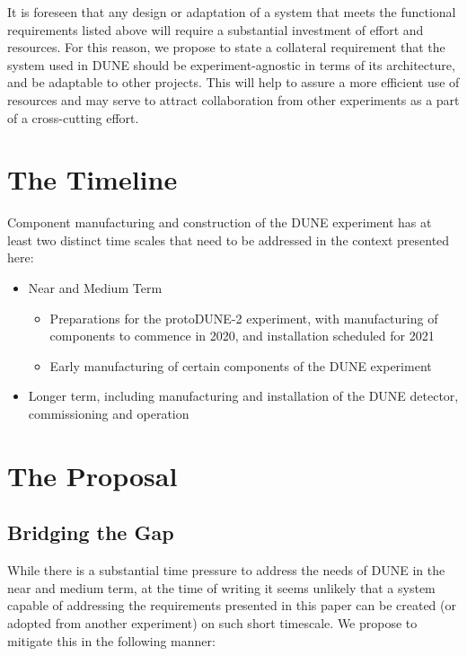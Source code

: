 \documentclass[pdftex,12pt,letter]{article}
\begin{document}
It is foreseen that any design or adaptation of a system that meets the functional requirements listed
above will require a substantial investment of effort and resources. For this reason, we propose to
state a collateral requirement that the system used in DUNE should be experiment-agnostic in
terms of its architecture, and be adaptable to other projects. This will help to assure a more
efficient use of resources and may serve to attract collaboration from other experiments
as a part of a cross-cutting effort.

\section{The Timeline}
Component manufacturing and construction of the DUNE experiment has at least two distinct time
scales that need to be addressed in the context presented here:

\begin{itemize}

\item Near and Medium Term
\begin{itemize}

\item Preparations for the protoDUNE-2 experiment, with manufacturing of components to commence in 2020, and installation scheduled for 2021
\item Early manufacturing of certain components of the DUNE experiment
\end{itemize}

\item Longer term, including manufacturing and installation of the DUNE detector, commissioning and operation
\end{itemize}

\section{The Proposal}
\subsection{Bridging the Gap}

While there is a substantial time pressure to address the needs of DUNE in the near and medium term,
at the time of writing it seems unlikely that a system capable of addressing the requirements
presented in this paper can be created (or adopted from another experiment) on such short timescale.
We propose to mitigate this in the following manner:
\end{document}
